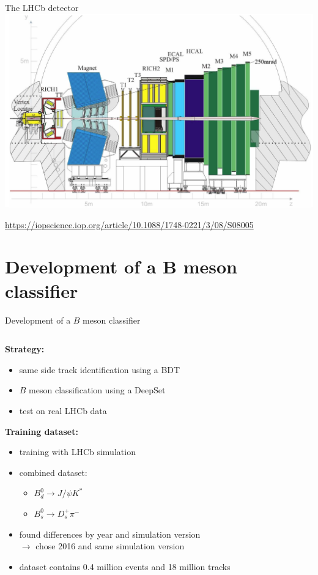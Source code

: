 \documentclass[aspectratio=1610, 10pt]{beamer}
\begin{document}
\begin{frame}{The LHCb detector}
  \centering
  \includegraphics[height=0.9\textheight]{images/lhcb_detector.png}

  \tiny \url{https://iopscience.iop.org/article/10.1088/1748-0221/3/08/S08005}
\end{frame}

\section*{Development of a B meson classifier}

\begin{frame}{Development of a $B$ meson classifier}
  \centering
  \begin{columns}
    \begin{column}{0.6\textwidth}
      \textbf{Strategy:}
      \begin{itemize}
        \item same side track identification using a BDT
        \item $B$ meson classification using a DeepSet
        \item test on real LHCb data
      \end{itemize}

      \pause
      \textbf{Training dataset:}
      \begin{itemize}
        \item training with LHCb simulation
        \item combined dataset:
        \begin{itemize}
          \item $B^0_d \rightarrow J/\psi K^*$
          \item $B^0_s \rightarrow D_s^+ \pi^-$
        \end{itemize}
        \item found differences by year and simulation version \\$\rightarrow$ chose 2016 and same simulation version
        \item dataset contains 0.4 million events and 18 million tracks
      \end{itemize}
    \end{column}
  \end{columns}
\end{frame}
\end{document}

